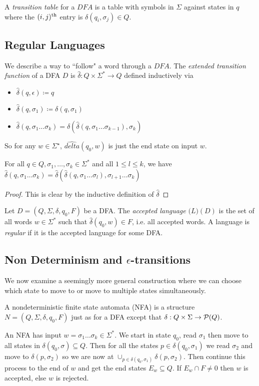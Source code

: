 \documentclass[10pt,a4paper]{article}
\begin{document}
A \emph{transition table} for a $DFA$ is a table with symbols in $\Sigma$ against states in $q$ where the $(i,j)\textsuperscript{th}$ entry is $\delta(q_i, \sigma_j) \in Q$.

\subsection*{Regular Languages}
We describe a way to ``follow" a word through a $DFA$. The \emph{extended transition function} of a DFA $D$ is $\hat{\delta} : Q \times \Sigma^\ast \to Q$ defined inductively via 
\begin{itemize}
\item $\hat{\delta}(q, \epsilon) \coloneqq q$
\item $\hat{\delta}(q, \sigma_1) \coloneqq \delta(q, \sigma_1)$
\item $\hat{\delta}(q, \sigma_1\ldots\sigma_k) = \delta(\hat{\delta}(q, \sigma_1\ldots\sigma_{k-1}), \sigma_k)$
\end{itemize}
So for any $w \in \Sigma^\star$, $\hat{delta}(q_0, w)$ is just the end state on input $w$.

\begin{lemma}
For all $q \in Q, \sigma_1, \ldots, \sigma_k \in \Sigma^\ast$ and all $1 \leq l \leq k$, we have $\hat{\delta}(q, \sigma_1\ldots\sigma_k) = \hat{\delta}(\hat{\delta}(q, \sigma_1\ldots\sigma_l), \sigma_{l+1}\ldots\sigma_k)$
\end{lemma}
\begin{proof}
This is clear by the inductive definition of $\hat{\delta}$
\end{proof}

Let $D = (Q, \Sigma, \delta, q_0, F)$ be a DFA. The \emph{accepted language} $\mathcal(L)(D)$ is the set of all words $w \in \Sigma^\ast$ such that $\hat{\delta}(q_0, w) \in F$, i.e. all accepted words. A language is \emph{regular} if it is the accepted language for some DFA.

\subsection*{Non Determinism and $\epsilon$-transitions}
We now examine a seemingly more general construction where we can choose which state to move to or move to multiple states simultaneously.

A nondeterministic finite state automata (NFA) is a structure $N=(Q, \Sigma, \delta, q_0, F)$ just as for a DFA except that $\delta:Q \times \Sigma \to \mathcal{P}(Q)$.

An NFA has input $w = \sigma_1\ldots\sigma_k \in \Sigma^\ast$. We start in state $q_0$, read $\sigma_1$ then move to all states in $\delta(q_0, \sigma) \subseteq Q$. Then for all the states $p \in \delta(q_0, \sigma_1)$ we read $\sigma_2$ and move to $\delta(p, \sigma_2)$ so we are now at $\cup_{p\in\delta(q_0, \sigma_1)} \delta(p, \sigma_2)$. Then continue this process to the end of $w$ and get the end states $E_w \subseteq Q$. If $E_w \cap F \neq 0$ then $w$ is accepted, else $w$ is rejected.
\end{document}
